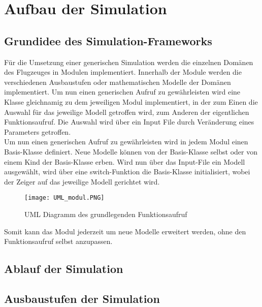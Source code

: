 \chapter{Aufbau der Simulation}
\section{Grundidee des Simulation-Frameworks}
Für die Umsetzung einer generischen Simulation werden die einzelnen Domänen des Flugzeuges in Modulen implementiert. Innerhalb der Module werden die verschiedenen Ausbaustufen oder mathematischen Modelle der Domänen implementiert. Um nun einen generischen Aufruf zu gewährleisten wird eine Klasse gleichnamig zu dem jeweiligen Modul implementiert, in der zum Einen die Auswahl für das jeweilige Modell getroffen wird, zum Anderen der eigentlichen Funktionsaufruf. Die Auswahl wird über ein Input File durch Veränderung eines Parameters getroffen. \\
Um nun einen generischen Aufruf zu gewährleisten wird in jedem Modul einen Basis-Klasse definiert. Neue Modelle können von der Basis-Klasse selbst oder von einem Kind der Basis-Klasse erben. Wird nun über das Input-File ein Modell ausgewählt, wird über eine switch-Funktion die Basis-Klasse initialisiert, wobei der Zeiger auf das jeweilige Modell gerichtet wird. \\
\begin{figure}[h]
\centering\texttt{[image: UML\_modul.PNG]}	
\caption{UML Diagramm des grundlegenden Funktionsaufruf}
\label{fig:UML_modul}
\end{figure}

Somit kann das Modul jederzeit um neue Modelle erweitert werden, ohne den Funktionsaufruf selbst anzupassen.  
\section{Ablauf der Simulation}

\section{Ausbaustufen der Simulation}
